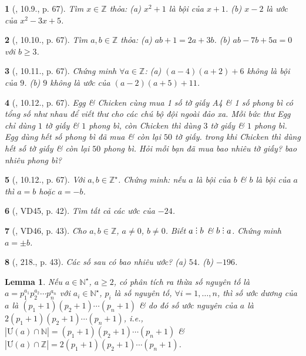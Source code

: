 \documentclass{article}
\newtheorem{baitoan}{}
\newtheorem{lemma}{Lemma}
\DeclareRobustCommand{\divby}{%
	\mathrel{\vbox{\baselineskip.65ex\lineskiplimit0pt\hbox{.}\hbox{.}\hbox{.}}}%
}
\begin{document}
\begin{baitoan}[\cite{Binh_boi_duong_Toan_6_tap_1}, 10.9., p. 67]
	Tìm $x\in\mathbb{Z}$ thỏa: (a) $x^2 + 1$ là bội của $x + 1$. (b) $x - 2$ là ước của $x^2 - 3x + 5$.
\end{baitoan}

\begin{baitoan}[\cite{Binh_boi_duong_Toan_6_tap_1}, 10.10., p. 67]
	Tìm $a,b\in\mathbb{Z}$ thỏa: (a) $ab + 1 = 2a + 3b$. (b) $ab - 7b + 5a = 0$ với $b\ge3$.
\end{baitoan}

\begin{baitoan}[\cite{Binh_boi_duong_Toan_6_tap_1}, 10.11., p. 67]
	Chứng minh $\forall a\in\mathbb{Z}$: (a) $(a - 4)(a + 2) + 6$ không là bội của $9$. (b) $9$ không là ước của $(a - 2)(a + 5) + 11$.
\end{baitoan}

\begin{baitoan}[\cite{Binh_boi_duong_Toan_6_tap_1}, 10.12., p. 67]
	Egg \& Chicken cùng mua 1 số tờ giấy A4 \& 1 số phong bì có tổng số như nhau để viết thư cho các chú bộ đội ngoài đảo xa. Mỗi bức thư Egg chỉ dùng $1$ tờ giấy \& $1$ phong bì, còn Chicken thì dùng $3$ tờ giấy \& $1$ phong bì. Egg dùng hết số phong bì đã mua \& còn lại $50$ tờ giấy. trong khi Chicken thì dùng hết số tờ giấy \& còn lại $50$ phong bì. Hỏi mỗi bạn đã mua bao nhiêu tờ giấy? bao nhiêu phong bì?
\end{baitoan}

\begin{baitoan}[\cite{Binh_boi_duong_Toan_6_tap_1}, 10.12., p. 67]
	Với $a,b\in\mathbb{Z}^\star$. Chứng minh: nếu $a$ là bội của $b$ \& $b$ là bội của $a$ thì $a = b$ hoặc $a = -b$.
\end{baitoan}

\begin{baitoan}[\cite{Tuyen_Toan_6}, VD45, p. 42]
	Tìm tất cả các ước của $-24$.
\end{baitoan}

\begin{baitoan}[\cite{Tuyen_Toan_6}, VD46, p. 43]
	Cho $a,b\in\mathbb{Z}$, $a\ne0$, $b\ne0$. Biết $a\divby b$ \& $b\divby a$. Chứng minh $a = \pm b$.
\end{baitoan}

\begin{baitoan}[\cite{Tuyen_Toan_6}, 218., p. 43]
	Các số sau có bao nhiêu ước? (a) $54$. (b) $-196$.
\end{baitoan}

\begin{lemma}
	\label{lemma: number of divisor}
	Nếu $a\in\mathbb{N}^\star$, $a\ge2$, có phân tích ra thừa số nguyên tố là $a = p_1^{a_1}p_2^{a_2}\cdots p_n^{a_n}$ với $a_i\in\mathbb{N}^\star$, $p_i$ là số nguyên tố, $\forall i = 1,\ldots,n$, thì số ước dương của $a$ là $(p_1 + 1)(p_2 + 1)\cdots(p_n + 1)$ \& do đó số ước nguyên của $a$ là $2(p_1 + 1)(p_2 + 1)\cdots(p_n + 1)$, i.e., $|\mbox{Ư}(a)\cap\mathbb{N}| = (p_1 + 1)(p_2 + 1)\cdots(p_n + 1)$ \& $|\mbox{Ư}(a)\cap\mathbb{Z}| = 2(p_1 + 1)(p_2 + 1)\cdots(p_n + 1)$.
\end{lemma}
\end{document}
